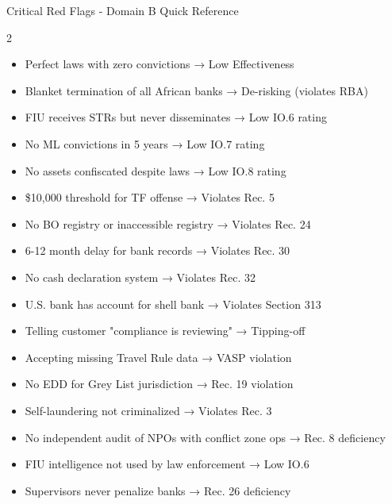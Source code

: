 \documentclass[11pt,a4paper]{beamer}
\begin{document}
	\begin{frame}{Critical Red Flags - Domain B Quick Reference}
		\begin{multicols}{2}
			\begin{itemize}
				\item Perfect laws with zero convictions → Low Effectiveness
				\item Blanket termination of all African banks → De-risking (violates RBA)
				\item FIU receives STRs but never disseminates → Low IO.6 rating
				\item No ML convictions in 5 years → Low IO.7 rating
				\item No assets confiscated despite laws → Low IO.8 rating
				\item \$10,000 threshold for TF offense → Violates Rec. 5
				\item No BO registry or inaccessible registry → Violates Rec. 24
				\item 6-12 month delay for bank records → Violates Rec. 30
				\item No cash declaration system → Violates Rec. 32
				\item U.S. bank has account for shell bank → Violates Section 313
				\item Telling customer "compliance is reviewing" → Tipping-off
				\item Accepting missing Travel Rule data → VASP violation
				\item No EDD for Grey List jurisdiction → Rec. 19 violation
				\item Self-laundering not criminalized → Violates Rec. 3
				\item No independent audit of NPOs with conflict zone ops → Rec. 8 deficiency
				\item FIU intelligence not used by law enforcement → Low IO.6
				\item Supervisors never penalize banks → Rec. 26 deficiency
			\end{itemize}
		\end{multicols}
	\end{frame}
\end{document}
